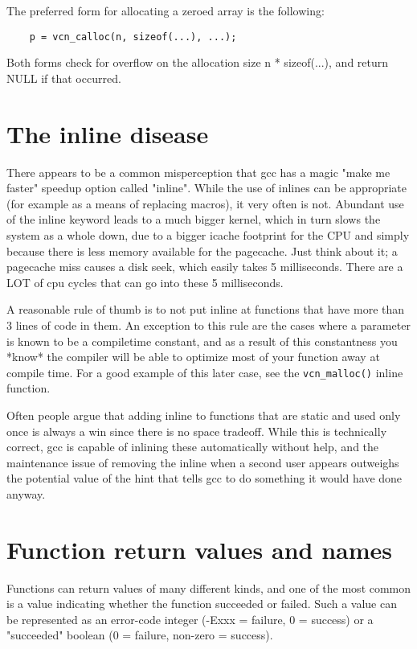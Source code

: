 \documentclass[pdftex,12pt, twocol]{article} %
\begin{document}
The preferred form for allocating a zeroed array is the following:

\begin{verbatim}
	p = vcn_calloc(n, sizeof(...), ...);
\end{verbatim}

Both forms check for overflow on the allocation size n * sizeof(...),
and return NULL if that occurred.


\section{The inline disease}

There appears to be a common misperception that gcc has a magic "make me
faster" speedup option called "inline". While the use of inlines can be
appropriate (for example as a means of replacing macros), it
very often is not. Abundant use of the inline keyword leads to a much bigger
kernel, which in turn slows the system as a whole down, due to a bigger
icache footprint for the CPU and simply because there is less memory
available for the pagecache. Just think about it; a pagecache miss causes a
disk seek, which easily takes 5 milliseconds. There are a LOT of cpu cycles
that can go into these 5 milliseconds.

A reasonable rule of thumb is to not put inline at functions that have more
than 3 lines of code in them. An exception to this rule are the cases where
a parameter is known to be a compiletime constant, and as a result of this
constantness you *know* the compiler will be able to optimize most of your
function away at compile time. For a good example of this later case, see
the \verb+vcn_malloc()+ inline function.

Often people argue that adding inline to functions that are static and used
only once is always a win since there is no space tradeoff. While this is
technically correct, gcc is capable of inlining these automatically without
help, and the maintenance issue of removing the inline when a second user
appears outweighs the potential value of the hint that tells gcc to do
something it would have done anyway.


\section{Function return values and names}

Functions can return values of many different kinds, and one of the
most common is a value indicating whether the function succeeded or
failed.  Such a value can be represented as an error-code integer
(-Exxx = failure, 0 = success) or a "succeeded" boolean (0 = failure,
non-zero = success).
\end{document}
